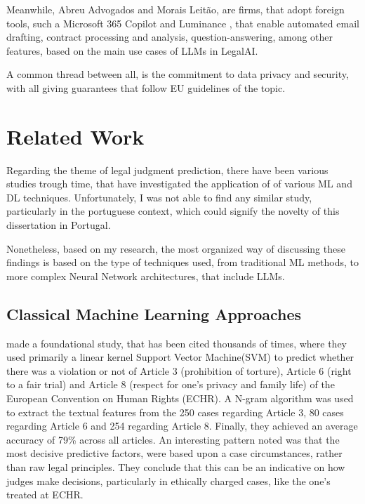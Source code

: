 \documentclass[11pt,a4paper,twoside,openright]{book}
\begin{document}
\par Meanwhile, Abreu Advogados and Morais Leitão, are firms, that adopt foreign  tools, such a Microsoft 365 Copilot \parencite{abreu_copilot_2025} and Luminance \parencite{mlgts_innovador_2025}, that enable  automated email drafting,  contract processing and analysis, question-answering, among other features, based on the main use cases of LLMs in LegalAI.

\par A common thread between all, is the commitment to data privacy and security, with all giving guarantees that follow EU guidelines of the topic.



















\section{Related Work}

Regarding the theme of legal judgment prediction, there have been various studies trough time, that have investigated the application of 
of various ML and DL techniques. Unfortunately, I was not able to find any similar study, particularly in the portuguese context, which could signify
the novelty of this dissertation in Portugal.

Nonetheless, based on my research, the most organized way of discussing these findings is 
based on the type of techniques used, from traditional ML methods, to more complex Neural Network architectures, that include LLMs.

\subsection{Classical Machine Learning Approaches}
 \textcite{aletras_predicting_2016} made a foundational study, that has been cited thousands of times, 
where they used primarily a linear kernel Support Vector Machine(SVM) to predict whether there was a violation or not of Article 3 (prohibition of torture), Article 6 (right to a fair trial) and Article 8 (respect for one's privacy and family life) of the European Convention on Human Rights (ECHR).
A N-gram algorithm was used to extract the textual features from the 250 cases regarding Article 3, 80 cases regarding Article 6 and 254 regarding Article 8. 
Finally, they achieved an average accuracy of 79\% across all articles. 
An interesting pattern noted was that the most decisive predictive factors, were based upon a case circumstances, rather than raw legal principles. 
They conclude that this can be an indicative on how judges make decisions, particularly in ethically charged cases, like the one's treated at ECHR.
\end{document}
